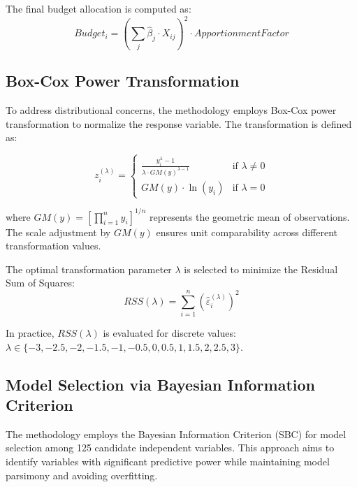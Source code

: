 The final budget allocation is computed as:
\begin{equation}
Budget_i = \left(\sum_{j} \hat{\beta}_j \cdot X_{ij}\right)^2 \cdot ApportionmentFactor
\end{equation}

\subsection{Box-Cox Power Transformation}

To address distributional concerns, the methodology employs Box-Cox power transformation to normalize the response variable. The transformation is defined as:

\begin{equation}
z_i^{(\lambda)} = \begin{cases}
\frac{y_i^\lambda - 1}{\lambda \cdot GM(y)^{\lambda-1}} & \text{if } \lambda \neq 0 \\
GM(y) \cdot \ln(y_i) & \text{if } \lambda = 0
\end{cases}
\end{equation}

where $GM(y) = \left[\prod_{i=1}^n y_i\right]^{1/n}$ represents the geometric mean of observations. The scale adjustment by $GM(y)$ ensures unit comparability across different transformation values.

The optimal transformation parameter $\lambda$ is selected to minimize the Residual Sum of Squares:
\begin{equation}
RSS(\lambda) = \sum_{i=1}^n \left(\hat{\varepsilon}_i^{(\lambda)}\right)^2
\end{equation}

In practice, $RSS(\lambda)$ is evaluated for discrete values: \\ $\lambda \in \{-3, -2.5, -2, -1.5, -1, -0.5, 0, 0.5, 1, 1.5, 2, 2.5, 3\}$.

\subsection{Model Selection via Bayesian Information Criterion}

The methodology employs the Bayesian Information Criterion (SBC) for model selection among 125 candidate independent variables. This approach aims to identify variables with significant predictive power while maintaining model parsimony and avoiding overfitting.

